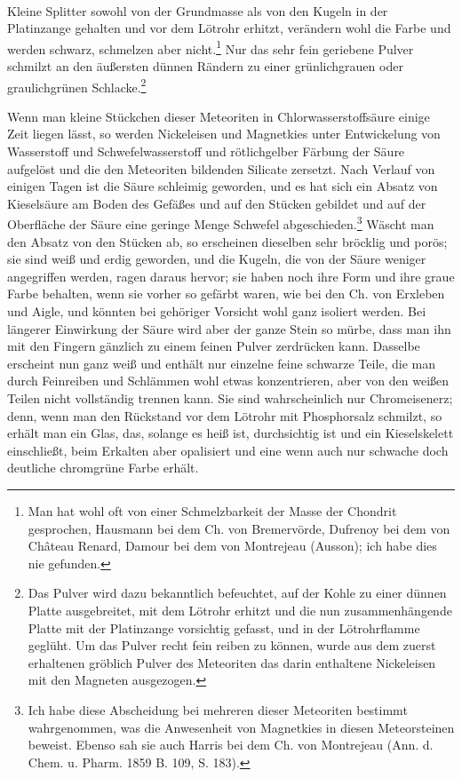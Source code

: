 \documentclass[a4paper, 11pt, oneside]{article}
\begin{document}
\paragraph{}
Kleine Splitter sowohl von der Grundmasse als von den Kugeln in der Platinzange gehalten und vor dem Lötrohr erhitzt, verändern wohl die Farbe und werden schwarz, schmelzen aber nicht.\footnote{Man hat wohl oft von einer Schmelzbarkeit der Masse der Chondrit gesprochen, Hausmann bei dem Ch. von Bremervörde, Dufrenoy bei dem von Château Renard, Damour bei dem von Montrejeau (Ausson); ich habe dies nie gefunden.} Nur das sehr fein geriebene Pulver schmilzt an den äußersten dünnen Rändern zu einer grünlichgrauen oder graulichgrünen Schlacke.\footnote{Das Pulver wird dazu bekanntlich befeuchtet, auf der Kohle zu einer dünnen Platte ausgebreitet, mit dem Lötrohr erhitzt und die nun zusammenhängende Platte mit der Platinzange vorsichtig gefasst, und in der Lötrohrflamme geglüht. Um das Pulver recht fein reiben zu können, wurde aus dem zuerst erhaltenen gröblich Pulver des Meteoriten das darin enthaltene Nickeleisen mit den Magneten ausgezogen.}

Wenn man kleine Stückchen dieser Meteoriten in Chlorwasserstoffsäure einige Zeit liegen lässt, so werden Nickeleisen und Magnetkies unter Entwickelung von Wasserstoff und Schwefelwasserstoff und rötlichgelber Färbung der Säure aufgelöst und die den Meteoriten bildenden Silicate zersetzt. Nach Verlauf von einigen Tagen ist die Säure schleimig geworden, und es hat sich ein Absatz von Kieselsäure am Boden des Gefäßes und auf den Stücken gebildet und auf der Oberfläche der Säure eine geringe Menge Schwefel abgeschieden.\footnote{Ich habe diese Abscheidung bei mehreren dieser Meteoriten bestimmt wahrgenommen, was die Anwesenheit von Magnetkies in diesen Meteorsteinen beweist. Ebenso sah sie auch Harris bei dem Ch. von Montrejeau (Ann. d. Chem. u. Pharm. 1859 B. 109, S. 183).} Wäscht man den Absatz von den Stücken ab, so erscheinen dieselben sehr bröcklig und porös; sie sind weiß und erdig geworden, und die Kugeln, die von der Säure weniger angegriffen werden, ragen daraus hervor; sie haben noch ihre Form und ihre graue Farbe behalten, wenn sie vorher so gefärbt waren, wie bei den Ch. von Erxleben und Aigle, und könnten bei gehöriger Vorsicht wohl ganz isoliert werden. Bei längerer Einwirkung der Säure wird aber der ganze Stein so mürbe, dass man ihn mit den Fingern gänzlich zu einem feinen Pulver zerdrücken kann. Dasselbe erscheint nun ganz weiß und enthält nur einzelne feine schwarze Teile, die man durch Feinreiben und Schlämmen wohl etwas konzentrieren, aber von den weißen Teilen nicht vollständig trennen kann. Sie sind wahrscheinlich nur Chromeisenerz; denn, wenn man den Rückstand vor dem Lötrohr mit Phosphorsalz schmilzt, so erhält man ein Glas, das, solange es heiß ist, durchsichtig ist und ein Kieselskelett einschließt, beim Erkalten aber opalisiert und eine wenn auch nur schwache doch deutliche chromgrüne Farbe erhält.
\end{document}
